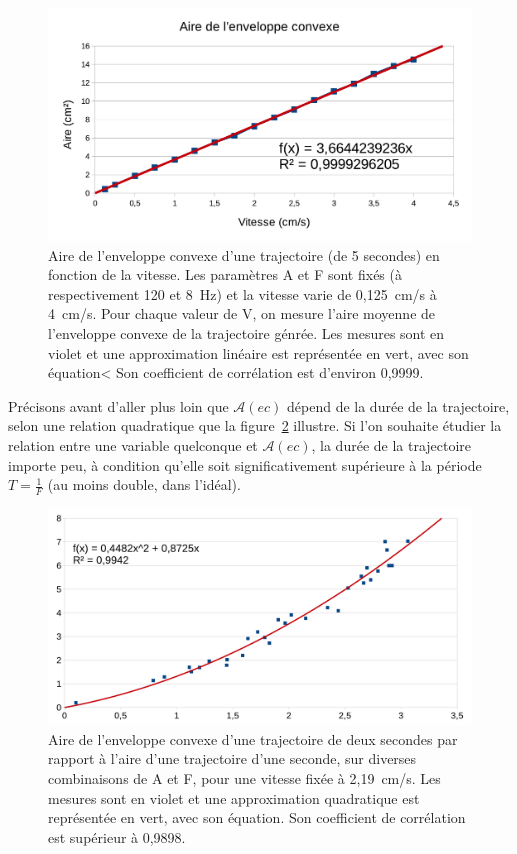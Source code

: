 	\begin{figure}[!htb]
		\centering
		\includegraphics[width=\textwidth]{figures/ch4/areaVspeed}
		\caption[Aire de l'enveloppe convexe en fonction de la vitesse]{Aire de l'enveloppe convexe d'une trajectoire (de 5 secondes) en fonction de la vitesse. Les paramètres A et F sont fixés (à respectivement 120\textdegree{} et 8~Hz) et la vitesse varie de 0,125~cm/s à 4~cm/s. Pour chaque valeur de V, on mesure l'aire moyenne de l'enveloppe convexe de la trajectoire génrée. Les mesures sont en violet et une approximation linéaire est représentée en vert, avec son équation< Son coefficient de corrélation est d'environ 0,9999.}
		\label{fig:avspeed}
	\end{figure}
	
	Précisons avant d'aller plus loin que $\mathcal{A}(ec)$ dépend de la durée de la trajectoire, selon une relation quadratique que la figure~\ref{fig:area_1s_2s} illustre. Si l'on souhaite étudier la relation entre une variable quelconque et $\mathcal{A}(ec)$, la durée de la trajectoire importe peu, à condition qu'elle soit significativement supérieure à la période $T = \frac{1}{F}$ (au moins double, dans l'idéal).
	
	\begin{figure}[!htb]
		\centering
		\includegraphics[width=\textwidth]{figures/ch4/area_1s_2s}
		\caption[Aire de l'enveloppe convexe sur 2~s en fonction de l'aire sur 1~s]{Aire de l'enveloppe convexe d'une trajectoire de deux secondes par rapport à l'aire d'une trajectoire d'une seconde, sur diverses combinaisons de A et F, pour une vitesse fixée à 2,19~cm/s. Les mesures sont en violet et une approximation quadratique est représentée en vert, avec son équation. Son coefficient de corrélation est supérieur à 0,9898.}
		\label{fig:area_1s_2s}
	\end{figure}
	
